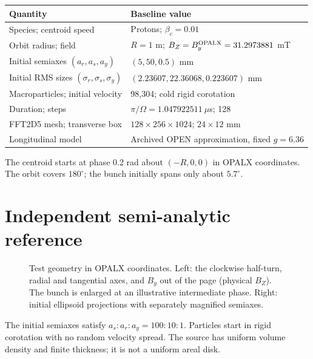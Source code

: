 \documentclass[10pt,a4paper]{article}
\begin{document}
\begin{center}\small
\begin{tabular}{ll}\toprule
Quantity & Baseline value\\\midrule
Species; centroid speed & Protons; $\beta_c=0.01$\\
Orbit radius; field & $R=1$ m; $B_Z=B_y^{\rm OPALX}=31.2973881$ mT\\
Initial semiaxes $(a_r,a_s,a_y)$ & $(5,50,0.5)$ mm\\
Initial RMS sizes $(\sigma_r,\sigma_s,\sigma_y)$ & $(2.23607,22.36068,0.223607)$ mm\\
Macroparticles; initial velocity & 98,304; cold rigid corotation\\
Duration; steps & $\pi/\Omega=1.047922511~\mu$s; 128\\
FFT2D5 mesh; transverse box & $128\times256\times1024$; $24\times12$ mm\\
Longitudinal model & Archived OPEN approximation, fixed $g=6.36$\\\bottomrule
\end{tabular}
\end{center}
The centroid starts at phase 0.2 rad about $(-R,0,0)$ in OPALX coordinates.
The orbit covers $180^\circ$; the bunch initially spans only about $5.7^\circ$.

\clearpage
\section{Independent semi-analytic reference}
\begin{figure}[H]
 \centering
 
 \caption{Test geometry in OPALX coordinates. Left: the clockwise half-turn,
 radial and tangential axes, and $B_y$ out of the page (physical $B_Z$).
 The bunch is enlarged at an illustrative intermediate phase.
 Right: initial ellipsoid projections with separately magnified semiaxes.}
 \label{fig:test-geometry}
\end{figure}
The initial semiaxes satisfy $a_s:a_r:a_y=100:10:1$.
Particles start in rigid corotation with no random velocity spread.
The source has uniform volume density and finite thickness; it is not a uniform
areal disk.

\clearpage
\end{document}

